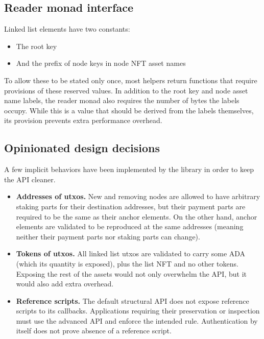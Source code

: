 \documentclass[../midgard.tex]{subfiles}
\begin{document}
\subsection{Reader monad interface}
\label{h:list-reader-monad-interface}

Linked list elements have two constants:
\begin{itemize}
  \item The root key
  \item And the prefix of node keys in node NFT asset names
\end{itemize}

To allow these to be stated only once, most helpers return functions that require provisions of these reserved values.
In addition to the root key and node asset name labels, the reader monad also requires the number of bytes the labels occupy.
While this is a value that should be derived from the labels themselves, its provision prevents extra performance overhead.

\subsection{Opinionated design decisions}
\label{h:list-opinionated-design-decisions}

A few implicit behaviors have been implemented by the library in order to keep the API cleaner.
\begin{itemize}
  \item \textbf{Addresses of utxos.} New and removing nodes are allowed to have arbitrary staking parts for their destination addresses, but their payment parts are required to be the same as their anchor elements.
    On the other hand, anchor elements are validated to be reproduced at the same addresses (meaning neither their payment parts nor staking parts can change).
  \item \textbf{Tokens of utxos.} All linked list utxos are validated to carry some ADA (which its quantity is exposed), plus the list NFT and no other tokens.
    Exposing the rest of the assets would not only overwhelm the API, but it would also add extra overhead.
  \item \textbf{Reference scripts.} The default structural API does not expose reference scripts to its callbacks. Applications requiring their preservation or inspection must use the advanced API and enforce the intended rule. Authentication by itself does not prove absence of a reference script.
\end{itemize}
\end{document}
